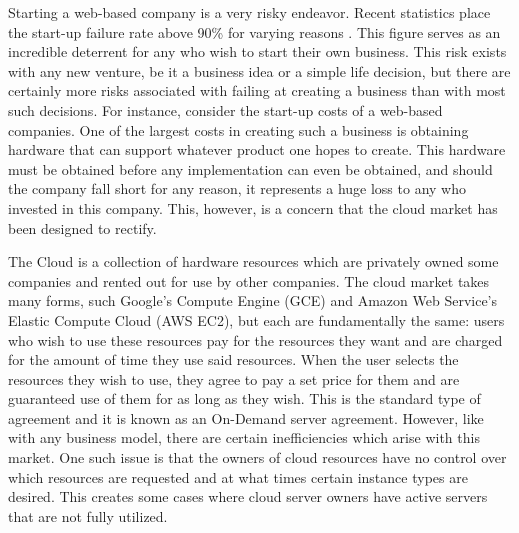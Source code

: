 \documentclass[thesis,proposal]{umassthesis}  %
\begin{document}
Starting a web-based company is a very risky endeavor. Recent statistics place the start-up failure rate above 90\% for varying reasons \cite{startupReport}. This figure serves as an incredible deterrent for any who wish to start their own business. This risk exists with any new venture, be it a business idea or a simple life decision, but there are certainly more risks associated with failing at creating a business than with most such decisions. For instance, consider the start-up costs of a web-based companies. One of the largest costs in creating such a business is obtaining hardware that can support whatever product one hopes to create. This hardware must be obtained before any implementation can even be obtained, and should the company fall short for any reason, it represents a huge loss to any who invested in this company. This, however, is a concern that the cloud market has been designed to rectify.\par

The Cloud is a collection of hardware resources which are privately owned some companies and rented out for use by other companies. The cloud market takes many forms, such Google’s Compute Engine (GCE) and Amazon Web Service's Elastic Compute Cloud (AWS EC2), but each are fundamentally the same: users who wish to use these resources pay for the resources they want and are charged for the amount of time they use said resources. When the user selects the resources they wish to use, they agree to pay a set price for them and are guaranteed use of them for as long as they wish. This is the standard type of agreement and it is known as an On-Demand server agreement. However, like with any business model, there are certain inefficiencies which arise with this market. One such issue is that the owners of cloud resources have no control over which resources are requested and at what times certain instance types are desired. This creates some cases where cloud server owners have active servers that are not fully utilized.\par
\end{document}
